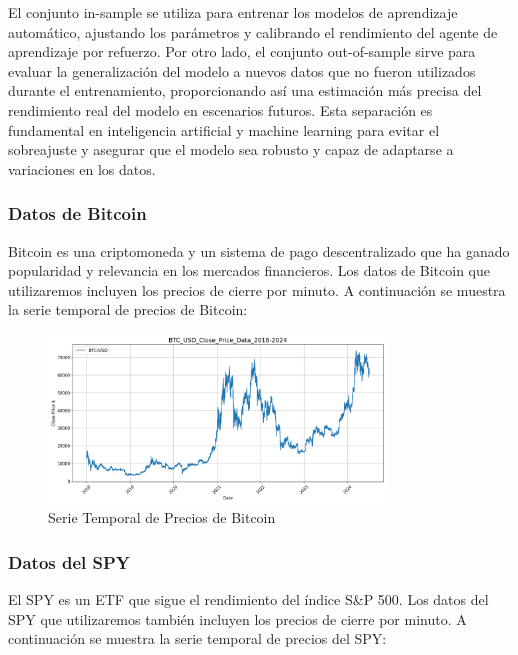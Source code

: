 \documentclass[a4paper,12pt, twoside]{report}
\begin{document}
El conjunto in-sample se utiliza para entrenar los modelos de aprendizaje automático, 
ajustando los parámetros y calibrando el rendimiento del agente de aprendizaje por refuerzo. 
Por otro lado, el conjunto out-of-sample sirve para evaluar la generalización del modelo a 
nuevos datos que no fueron utilizados durante el entrenamiento, proporcionando así una 
estimación más precisa del rendimiento real del modelo en escenarios futuros. Esta separación 
es fundamental en inteligencia artificial y machine learning para evitar el sobreajuste y 
asegurar que el modelo sea robusto y capaz de adaptarse a variaciones en los datos.



\subsubsection{Datos de Bitcoin}

Bitcoin es una criptomoneda y un sistema de pago descentralizado que ha ganado popularidad y relevancia en los mercados financieros. 
Los datos de Bitcoin que utilizaremos incluyen los precios de cierre por minuto. A continuación se muestra la serie temporal de precios 
de Bitcoin:

\begin{figure}[H]
    \centering
    \includegraphics[width=0.8\textwidth]{./figures/BTC_USD_Close_Price_Data_2018-2024.png}
    \caption{Serie Temporal de Precios de Bitcoin}
    \label{fig:bitcoin-prices}
\end{figure}

\subsubsection{Datos del SPY}

El SPY es un ETF que sigue el rendimiento del índice S\&P 500. Los datos del SPY que utilizaremos también incluyen los precios de cierre 
por minuto. A continuación se muestra la serie temporal de precios del SPY:
\end{document}
